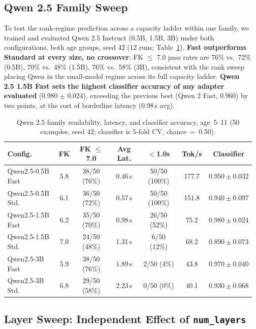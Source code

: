 \documentclass[pdflatex,sn-mathphys-num]{sn-jnl}%
\begin{document}
\subsection{Qwen 2.5 Family Sweep}\label{sec:qwen25}

To test the rank-regime prediction across a capacity ladder within one family, we trained and evaluated Qwen 2.5 Instruct (0.5B, 1.5B, 3B) under both configurations, both age groups, seed 42 (12 runs; Table~\ref{tab:qwen25}). \textbf{Fast outperforms Standard at every size, no crossover}: FK $\leq$ 7.0 pass rates are 76\% vs.\ 72\% (0.5B), 70\% vs.\ 48\% (1.5B), 76\% vs.\ 58\% (3B), consistent with the rank sweep placing Qwen in the small-model regime across its full capacity ladder. \textbf{Qwen 2.5 1.5B Fast sets the highest classifier accuracy of any adapter evaluated} (0.980 $\pm$ 0.024), exceeding the previous best (Qwen 2 Fast, 0.960) by two points, at the cost of borderline latency (0.98\,s avg).

\begin{table}[!h]
  \centering
  \caption{Qwen 2.5 family readability, latency, and classifier accuracy, age~5--11 (50 examples, seed 42; classifier is 5-fold CV, chance~=~0.50).}
  \label{tab:qwen25}
  \scriptsize
  \setlength{\tabcolsep}{3pt}
  \begin{tabular}{@{}lcccccc@{}}
    \toprule
    Config. & FK & FK $\leq$7.0 & Avg Lat. & $<$1.0s & Tok/s & Classifier \\
    \midrule
    Qwen2.5-0.5B Fast & 5.8 & 38/50 (76\%) & 0.46\,s & 50/50 (100\%) & 177.7 & $0.950 \pm 0.032$ \\
    Qwen2.5-0.5B Std. & 6.1 & 36/50 (72\%) & 0.57\,s & 50/50 (100\%) & 151.8 & $0.940 \pm 0.097$ \\
    Qwen2.5-1.5B Fast & 6.2 & 35/50 (70\%) & 0.98\,s & 26/50 (52\%)  & 75.2  & $\mathbf{0.980 \pm 0.024}$ \\
    Qwen2.5-1.5B Std. & 7.0 & 24/50 (48\%) & 1.31\,s & 6/50 (12\%)   & 68.2  & $0.890 \pm 0.073$ \\
    Qwen2.5-3B Fast   & 5.9 & 38/50 (76\%) & 1.89\,s & 2/50 (4\%)    & 43.8  & $0.970 \pm 0.040$ \\
    Qwen2.5-3B Std.   & 6.8 & 29/50 (58\%) & 2.23\,s & 0/50 (0\%)    & 40.1  & $0.930 \pm 0.068$ \\
    \bottomrule
  \end{tabular}
\end{table}

\subsection{Layer Sweep: Independent Effect of \texttt{num\_layers}}\label{sec:layersweep}
\end{document}
